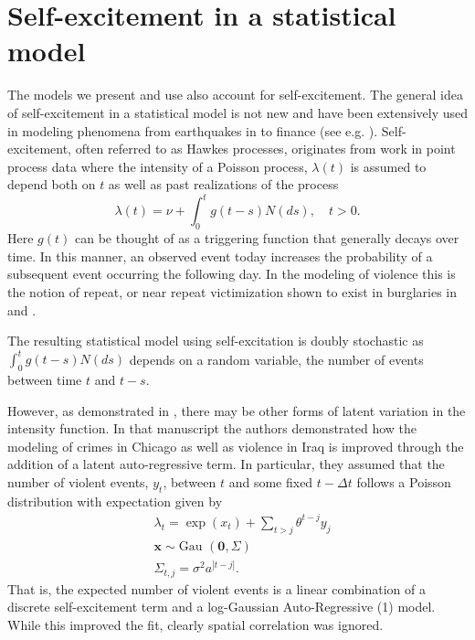 \documentclass[11pt]{isuthesis}
\begin{document}
\section{Self-excitement in a statistical model}
The models we present and use also account for self-excitement.  The general idea of self-excitement in a statistical model is not new and have been extensively used in modeling phenomena from earthquakes in \cite{ogata1988statistical} to finance (see e.g. \cite{bacry2015hawkes}).  Self-excitement, often referred to as Hawkes processes, originates from \cite{hawkes1971spectra} work in point process data where the intensity of a Poisson process, $\lambda(t)$ is assumed to depend both on $t$ as well as past realizations of the process
\begin{equation}
\lambda(t)=\nu + \int_{0}^t g(t-s)N(ds),\quad t>0.
\end{equation}
Here $g(t)$ can be thought of as a triggering function that generally decays over time.  In this manner, an observed event today increases the probability of a subsequent event occurring the following day.  In the modeling of violence this is the notion of repeat, or near repeat victimization shown to exist in burglaries in \cite{johnson1997new} and \cite{johnson2007space}. 

The resulting statistical model using self-excitation is doubly stochastic as $\int_{0}^t g(t-s)N(ds)$ depends on a random variable, the number of events between time $t$ and $t-s$.  

However, as demonstrated in \cite{mohler2013modeling}, there may be other forms of latent variation in the intensity function.  In that manuscript the authors demonstrated how the modeling of crimes in Chicago as well as violence in Iraq is improved through the addition of a latent auto-regressive term.  In particular, they assumed that the number of violent events, $y_t$, between $t$ and some fixed $t-\Delta t$ follows a Poisson distribution with expectation given by
\begin{align}
& \lambda_t  =\exp(x_t)+\sum_{t>j} \theta^{t-j} y_j\\
& \boldsymbol{x} \sim \mbox{Gau }(\boldsymbol{0},\Sigma)\\
& \Sigma_{t,j} =\sigma^2 a^{|t-j|}.
\end{align}
That is, the expected number of violent events is a linear combination of a discrete self-excitement term and a log-Gaussian Auto-Regressive (1) model.  While this improved the fit, clearly spatial correlation was ignored.
\end{document}
